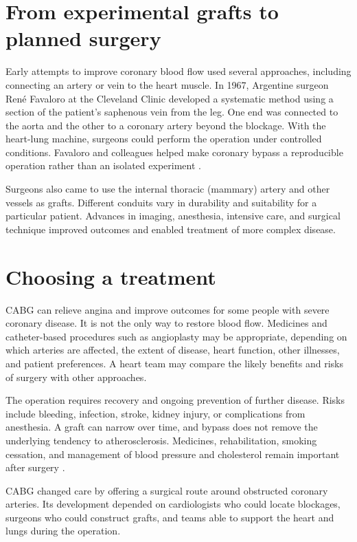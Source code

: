 \documentclass[12pt,oneside]{book}
\begin{document}
\section{From experimental grafts to planned surgery}
Early attempts to improve coronary blood flow used several approaches,
including connecting an artery or vein to the heart muscle. In 1967,
Argentine surgeon René Favaloro at the Cleveland Clinic developed a
systematic method using a section of the patient's saphenous vein from the
leg. One end was connected to the aorta and the other to a coronary artery
beyond the blockage. With the heart-lung machine, surgeons could perform
the operation under controlled conditions. Favaloro and colleagues helped
make coronary bypass a reproducible operation rather than an isolated
experiment \cite{clevelandCABGHistory}.

Surgeons also came to use the internal thoracic (mammary) artery and other
vessels as grafts. Different conduits vary in durability and suitability
for a particular patient. Advances in imaging, anesthesia, intensive
care, and surgical technique improved outcomes and enabled treatment of
more complex disease.

\section{Choosing a treatment}
CABG can relieve angina and improve outcomes for some people with severe
coronary disease. It is not the only way to restore blood flow. Medicines
and catheter-based procedures such as angioplasty may be appropriate,
depending on which arteries are affected, the extent of disease, heart
function, other illnesses, and patient preferences. A heart team may
compare the likely benefits and risks of surgery with other approaches.

The operation requires recovery and ongoing prevention of further disease.
Risks include bleeding, infection, stroke, kidney injury, or complications
from anesthesia. A graft can narrow over time, and bypass does not remove
the underlying tendency to atherosclerosis. Medicines, rehabilitation,
smoking cessation, and management of blood pressure and cholesterol remain
important after surgery \cite{clevelandCABGHistory}.

CABG changed care by offering a surgical route around obstructed coronary
arteries. Its development depended on cardiologists who could locate
blockages, surgeons who could construct grafts, and teams able to support
the heart and lungs during the operation.
\end{document}
